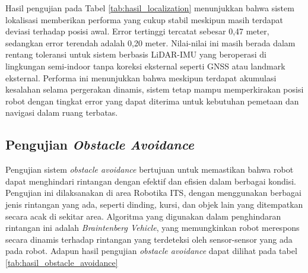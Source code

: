 Hasil pengujian pada Tabel \ref{tab:hasil_localization} menunjukkan bahwa sistem
lokalisasi memberikan performa yang cukup stabil meskipun masih terdapat deviasi
terhadap posisi awal. Error tertinggi tercatat sebesar 0{,}47 meter, sedangkan error
terendah adalah 0{,}20 meter. Nilai-nilai ini masih berada dalam rentang
toleransi untuk sistem berbasis LiDAR-IMU yang beroperasi di lingkungan semi-indoor
tanpa koreksi eksternal seperti GNSS atau landmark eksternal. Performa ini menunjukkan
bahwa meskipun terdapat akumulasi kesalahan selama pergerakan dinamis, sistem
tetap mampu memperkirakan posisi robot dengan tingkat error yang dapat diterima
untuk kebutuhan pemetaan dan navigasi dalam ruang terbatas.

\subsection{Pengujian \emph{Obstacle Avoidance}}
Pengujian sistem \emph{obstacle avoidance} bertujuan untuk memastikan bahwa robot
dapat menghindari rintangan dengan efektif dan efisien dalam berbagai kondisi.
Pengujian ini dilaksanakan di area Robotika ITS, dengan menggunakan berbagai jenis
rintangan yang ada, seperti dinding, kursi, dan objek lain yang ditempatkan
secara acak di sekitar area. Algoritma yang digunakan dalam penghindaran rintangan
ini adalah \emph{Braintenberg Vehicle}, yang memungkinkan robot merespons secara
dinamis terhadap rintangan yang terdeteksi oleh sensor-sensor yang ada pada robot.
Adapun hasil pengujian \emph{obstacle avoidance} dapat dilihat pada tabel \ref{tab:hasil_obstacle_avoidance}

